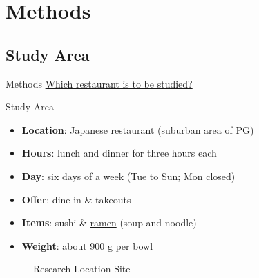 \documentclass{beamer}
\begin{document}
\section{Methods}
\subsection{Study Area}
\begin{frame}{Methods}
    \underline{Which restaurant is to be studied?}
    \begin{block}{Study Area}
        \begin{itemize}
            \item \textbf{Location}: Japanese restaurant (suburban area of PG)
            \item \textbf{Hours}: lunch and dinner for three hours each
            \item \textbf{Day}: six days of a week (Tue to Sun; Mon closed)
            \item \textbf{Offer}: dine-in \& takeouts
            \item \textbf{Items}: sushi \& \underline{ramen} (soup and noodle)
            \item \textbf{Weight}: about 900 g per bowl
        \end{itemize}
    \end{block}
    
        \begin{figure}
            \centering
            \qquad
            \caption{Research Location Site}
        \end{figure}
\end{frame}

\end{document}
